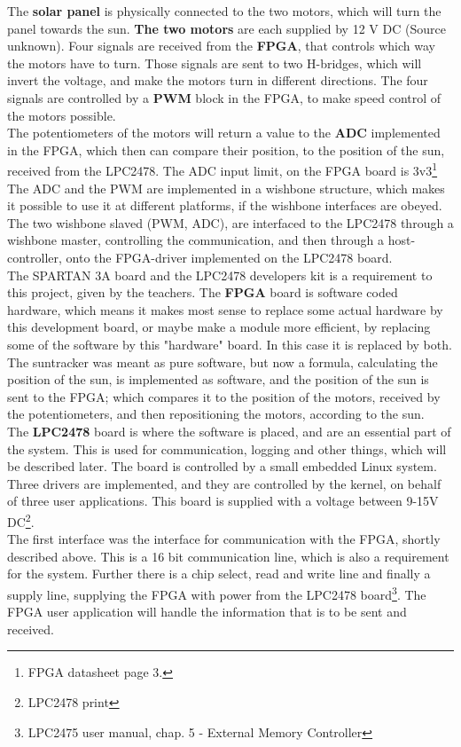The \textbf{solar panel} is physically connected to the two motors, which will turn the panel towards the sun. \textbf{The two motors} are each supplied by 12 V DC (Source unknown). Four signals are received from the \textbf{FPGA}, that controls which way the motors have to turn. Those signals are sent to two H-bridges, which will invert the voltage, and make the motors turn in different directions. The four signals are controlled by a \textbf{PWM} block in the FPGA, to make speed control of the motors possible. \\
The potentiometers of the motors will return a value to the \textbf{ADC} implemented in the FPGA, which then can compare their position, to the position of the sun, received from the LPC2478. The ADC input limit, on the FPGA board is 3v3\footnote{FPGA datasheet page 3.}\\
The ADC and the PWM are implemented in a wishbone structure, which makes it possible to use it at different platforms, if the wishbone interfaces are obeyed. The two wishbone slaved (PWM, ADC), are interfaced to the LPC2478 through a wishbone master, controlling the communication, and then through a host-controller, onto the FPGA-driver implemented on the LPC2478 board. \\
The SPARTAN 3A board and the LPC2478 developers kit is a requirement to this project, given by the teachers. The \textbf{FPGA} board is software coded hardware, which means it makes most sense to replace some actual hardware by this development board, or maybe make a module more efficient, by replacing some of the software by this "hardware" board. In this case it is replaced by both. The suntracker was meant as pure software, but now a formula, calculating the position of the sun, is implemented as software, and the position of the sun is sent to the FPGA; which compares it to the position of the motors, received by the potentiometers, and then repositioning the motors, according to the sun. \\
The \textbf{LPC2478} board is where the software is placed, and are an essential part of the system. This is used for communication, logging and other things, which will be described later. The board is controlled by a small embedded Linux system. Three drivers are implemented, and they are controlled by the kernel, on behalf of three user applications. This board is supplied with a voltage between 9-15V DC\footnote{LPC2478 print}. \\
The first interface was the interface for communication with the FPGA, shortly described above. This is a 16 bit communication line, which is also a requirement for the system. Further there is a chip select, read and write line and finally a supply line, supplying the FPGA with power from the LPC2478 board\footnote{LPC2475 user manual, chap. 5 - External Memory Controller}. The FPGA user application will handle the information that is to be sent and received. \\
